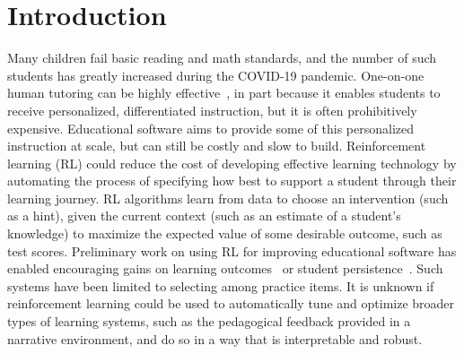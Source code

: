 \documentclass[sn-mathphys,Numbered]{sn-jnl}%
\theoremstyle{thmstyleone}%
\theoremstyle{thmstyletwo}%
\theoremstyle{thmstylethree}%
\begin{document}



\maketitle

\section{Introduction}\label{sec1}

Many children fail basic reading and math standards, and the number of such students has greatly increased during the COVID-19 pandemic.  
One-on-one human tutoring can be highly effective~\cite{nickow2020impressive}, in part because it enables students to receive personalized, differentiated instruction, but it is often prohibitively expensive. Educational software aims to provide some of this personalized instruction  at scale, but can still be costly and slow to build. 
Reinforcement learning (RL) could reduce the cost of developing effective learning technology by automating the process of specifying how best to support a student through their learning journey.  
RL algorithms learn from data to choose an intervention (such as a hint), given the current context (such as an estimate of a student's knowledge) to maximize the expected value of some desirable outcome, such as test scores.
Preliminary work on using RL for improving educational software has enabled encouraging gains on learning outcomes~\cite{mandel2014offline,chi2011empirically,park2019model,bassen2020reinforcement} or student persistence~\cite{mandel2014offline,bassen2020reinforcement}. Such systems have been limited to selecting among practice items. It is unknown if reinforcement learning could be used to automatically tune and optimize broader types of learning systems, such as the pedagogical feedback provided in a narrative environment, and do so in a way that is interpretable and robust. 
\end{document}
